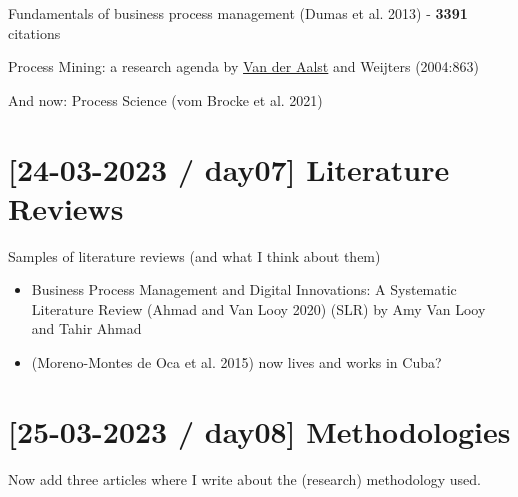 \documentclass[
  letterpaper,
  DIV=11,
  numbers=noendperiod]{scrreprt}
\begin{document}
\begin{tcolorbox}[enhanced jigsaw, coltitle=black, arc=.35mm, breakable, opacityback=0, toptitle=1mm, left=2mm, colframe=quarto-callout-tip-color-frame, colbacktitle=quarto-callout-tip-color!10!white, bottomtitle=1mm, titlerule=0mm, title=\textcolor{quarto-callout-tip-color}{\faLightbulb}\hspace{0.5em}{\href{https://kodu.ut.ee/~dumas/}{Marlon Dumas, University of Tartu}}, rightrule=.15mm, bottomrule=.15mm, opacitybacktitle=0.6, toprule=.15mm, leftrule=.75mm, colback=white]


Fundamentals of business process management (Dumas et al. 2013) -
\textbf{3391} citations

\end{tcolorbox}

Process Mining: a research agenda by
\href{https://orcid.org/0000-0002-0955-6940}{Van der Aalst} and Weijters
(2004:863)

And now: Process Science (vom Brocke et al. 2021)

\hypertarget{day07-literature-reviews}{%
\section{{[}24-03-2023 / day07{]} Literature
Reviews}\label{day07-literature-reviews}}

Samples of literature reviews (and what I think about them)

\begin{itemize}
\item
  Business Process Management and Digital Innovations: A Systematic
  Literature Review (Ahmad and Van Looy 2020) (SLR) by Amy
  Van Looy and Tahir Ahmad
\item
  (Moreno-Montes de Oca et al. 2015) now lives and works in Cuba?
\end{itemize}

\hypertarget{day08-methodologies}{%
\section{{[}25-03-2023 / day08{]}
Methodologies}\label{day08-methodologies}}

Now add three articles where I write about the (research) methodology
used.
\end{document}
